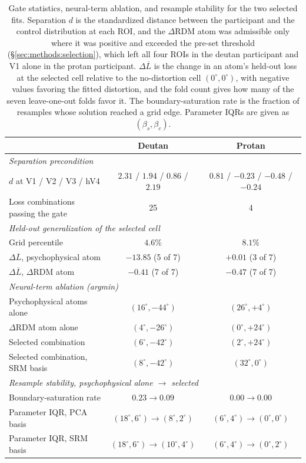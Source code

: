 \begin{table}[htbp]
  \caption{Gate statistics, neural-term ablation, and resample stability for the two selected fits. Separation $d$ is the standardized distance between the participant and the control distribution at each ROI, and the $\Delta$RDM atom was admissible only where it was positive and exceeded the pre-set threshold (\S\ref{sec:methods:selection}), which left all four ROIs in the deutan participant and V1 alone in the protan participant. $\Delta\overline{L}$ is the change in an atom's held-out loss at the selected cell relative to the no-distortion cell $(0^\circ, 0^\circ)$, with negative values favoring the fitted distortion, and the fold count gives how many of the seven leave-one-out folds favor it. The boundary-saturation rate is the fraction of resamples whose solution reached a grid edge. Parameter IQRs are given as $(\beta_s, \beta_c)$.}
  \label{tab:fit_stability}
  \centering
  \small
  \begin{tabular}{lcc}
    \toprule
    & Deutan & Protan \\ \midrule
    \multicolumn{3}{l}{\emph{Separation precondition}} \\
    \quad $d$ at V1 / V2 / V3 / hV4 & $2.31$ / $1.94$ / $0.86$ / $2.19$ & $0.81$ / $-0.23$ / $-0.48$ / $-0.24$ \\
    \quad Loss combinations passing the gate & 25 & 4 \\ \midrule
    \multicolumn{3}{l}{\emph{Held-out generalization of the selected cell}} \\
    \quad Grid percentile & $4.6\%$ & $8.1\%$ \\
    \quad $\Delta\overline{L}$, psychophysical atom & $-13.85$ (5 of 7) & $+0.01$ (3 of 7) \\
    \quad $\Delta\overline{L}$, $\Delta$RDM atom & $-0.41$ (7 of 7) & $-0.47$ (7 of 7) \\ \midrule
    \multicolumn{3}{l}{\emph{Neural-term ablation (argmin)}} \\
    \quad Psychophysical atoms alone & $(16^\circ, -44^\circ)$ & $(26^\circ, +4^\circ)$ \\
    \quad $\Delta$RDM atom alone & $(4^\circ, -26^\circ)$ & $(0^\circ, +24^\circ)$ \\
    \quad Selected combination & $(6^\circ, -42^\circ)$ & $(2^\circ, +24^\circ)$ \\
    \quad Selected combination, SRM basis & $(8^\circ, -42^\circ)$ & $(32^\circ, 0^\circ)$ \\ \midrule
    \multicolumn{3}{l}{\emph{Resample stability, psychophysical alone $\rightarrow$ selected}} \\
    \quad Boundary-saturation rate & $0.23 \rightarrow 0.09$ & $0.00 \rightarrow 0.00$ \\
    \quad Parameter IQR, PCA basis & $(18^\circ, 6^\circ) \rightarrow (8^\circ, 2^\circ)$ & $(6^\circ, 4^\circ) \rightarrow (0^\circ, 0^\circ)$ \\
    \quad Parameter IQR, SRM basis & $(18^\circ, 6^\circ) \rightarrow (10^\circ, 4^\circ)$ & $(6^\circ, 4^\circ) \rightarrow (0^\circ, 2^\circ)$ \\
    \bottomrule
  \end{tabular}
\end{table}


